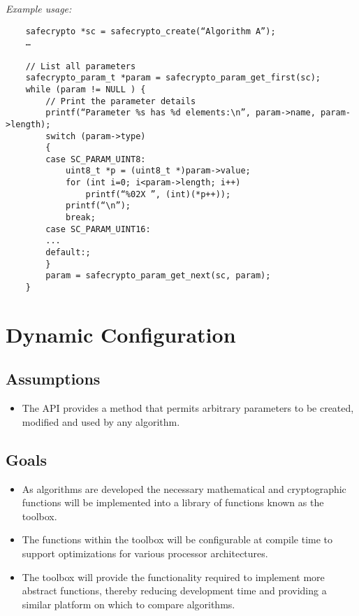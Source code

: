 \vspace{1em}
\textit{Example usage:}

\indent\begin{verbatim}
    safecrypto *sc = safecrypto_create(“Algorithm A”);
    …

    // List all parameters
    safecrypto_param_t *param = safecrypto_param_get_first(sc);
    while (param != NULL ) {
        // Print the parameter details
        printf(“Parameter %s has %d elements:\n”, param->name, param->length);
        switch (param->type)
        {
        case SC_PARAM_UINT8:
            uint8_t *p = (uint8_t *)param->value;
            for (int i=0; i<param->length; i++)
                printf(“%02X ”, (int)(*p++));
            printf(“\n”);
            break;
        case SC_PARAM_UINT16:
        ...
        default:;
        }
        param = safecrypto_param_get_next(sc, param);
    }
\end{verbatim}



\newpage
\section{Dynamic Configuration}

\subsection{Assumptions}

\begin{itemize}
\item The API provides a method that permits arbitrary parameters to be created, modified and used by any algorithm.
\end{itemize}

\subsection{Goals}

\begin{itemize}
\item As algorithms are developed the necessary mathematical and cryptographic functions will be implemented into a library of functions known as the toolbox.
\item The functions within the toolbox will be configurable at compile time to support optimizations for various processor architectures.
\item The toolbox will provide the functionality required to implement more abstract functions, thereby reducing development time and providing a similar platform on which to compare algorithms.
\end{itemize}

